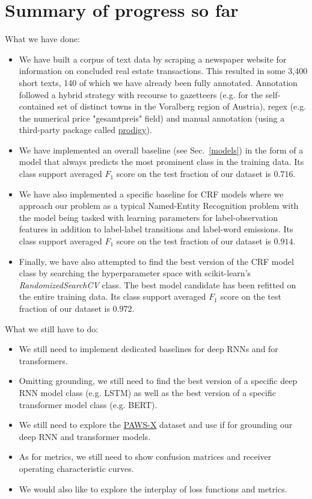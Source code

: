 \documentclass[11pt]{article}
\begin{document}
\section{Summary of progress so far}
What we have done:
\begin{itemize}
    \item We have built a corpus of text data by scraping a newspaper website for information on concluded real estate transactions. This resulted in some 3,400 short texts, 140 of which we have already been fully annotated. Annotation followed a hybrid strategy with recourse to gazetteers (e.g. for the self-contained set of distinct towns in the Voralberg region of Austria), regex (e.g. the numerical price "gesamtpreis" field) and manual annotation (using a third-party package called \href{https://prodi.gy/}{prodigy}).
    \item We have implemented an overall baseline (see Sec.~\ref{models}) in the form of a model that always predicts the most prominent class in the training data. Its class support averaged $F_1$ score on the test fraction of our dataset is $0.716$.
    \item We have also implemented a specific baseline for CRF models where we approach our problem as a typical Named-Entity Recognition problem with the model being tasked with learning parameters for label-observation features in addition to label-label transitions and label-word emissions. Its class support averaged $F_1$ score on the test fraction of our dataset is $0.914$.
    \item Finally, we have also attempted to find the best version of the CRF model class by searching the hyperparameter space with scikit-learn's \emph{RandomizedSearchCV} class. The best model candidate has been refitted on the entire training data. Its class support averaged $F_1$ score on the test fraction of our dataset is $0.972$.
\end{itemize}
What we still have to do:
\begin{itemize}
    \item We still need to implement dedicated baselines for deep RNNs and for transformers.
    \item Omitting grounding, we still need to find the best version of a specific deep RNN model class (e.g. LSTM) as well as the best version of a specific transformer model class (e.g. BERT).
    \item We still need to explore the \href{https://github.com/google-research-datasets/paws}{PAWS-X} dataset and use if for grounding our deep RNN and transformer models. 
    \item As for metrics, we still need to show confusion matrices and receiver operating characteristic curves.
    \item We would also like to explore the interplay of loss functions and metrics.
\end{itemize}
\end{document}
